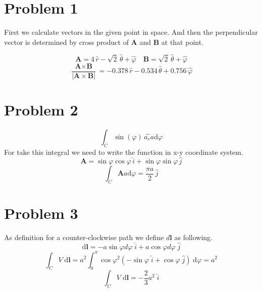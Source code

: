 \documentclass[12pt]{article}
\begin{document}
	
	\newpage
	\pagestyle{fancy}
	\fancyhf{}
	\cfoot{\thepage}
	
	\section{Problem 1}
	First we calculate vectors in the given point in space. And then the perpendicular vector is determined by cross product of $\textbf{A}$ and $\textbf{B}$ at that point.
	
	\begin{equation}
		\textbf{A} = 4\, \hat{r} - \sqrt{2} \, \hat{\theta} + \hat{\varphi}  \quad \textbf{B} = \sqrt{2} \, \hat{\theta} + \hat{\varphi}
	\end{equation}
	\begin{equation}
		\frac{ \textbf{A} \times \textbf{B}}{|\textbf{A} \times \textbf{B}|} = -0.378\, \hat{r} - 0.534 \, \hat{\theta} + 0.756 \, \hat{\varphi}
	\end{equation}
	
	\section{Problem 2}
	
	\begin{equation}
		\int_{C} \sin(\varphi) \, \hat{a_r} a \text{d}\varphi
	\end{equation}
	For take this integral we need to write the function in x-y coordinate system. 
	\begin{equation}
		\textbf{A} = \sin{\varphi} \cos{\varphi} \, \hat{i} + \sin{\varphi} \sin{\varphi} \, \hat{j} 
	\end{equation} 
		\begin{equation}
		\int_{C} \textbf{A} a \text{d}\varphi = \frac{\pi a}{2} \, \hat{j}
	\end{equation}
	\section{Problem 3}
	As definition for a counter-clockwise path we define $d\textbf{l}$ as following.
	\begin{equation}
		\text{d}\textbf{l} = - a \sin{\varphi} d\varphi \; \hat{i} + a \cos{\varphi} d\varphi \; \hat{j}
	\end{equation}
	\begin{equation}
		\int_C V \; \text{d}\textbf{l} = a^2 \int_0^\pi \cos{\varphi}^2 \left( - \sin{\varphi} \; \hat{i} +  \cos{\varphi} \; \hat{j} \right) \; \text{d}\varphi = a^2 
	\end{equation}
	\begin{equation}
		\int_C V\; \text{d}\textbf{l} = -\frac23 a^2 \; \hat{i}
	\end{equation}
\end{document}
